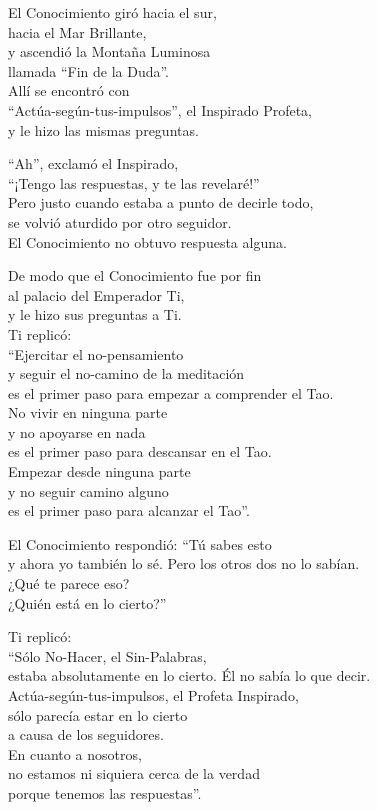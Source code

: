 \documentclass[hidelinks]{memoir}
\begin{document}
	El Conocimiento giró hacia el sur,\\
	hacia el Mar Brillante,\\
	y ascendió la Montaña Luminosa\\
	llamada ``Fin de la Duda''.\\
	Allí se encontró con\\
	``Actúa-según-tus-impulsos'', el Inspirado Profeta,\\
	y le hizo las mismas preguntas.
	
	``Ah'', exclamó el Inspirado,\\
	``¡Tengo las respuestas, y te las revelaré!''\\
	Pero justo cuando estaba a punto de decirle todo,\\
	se volvió aturdido por otro seguidor.\\
	El Conocimiento no obtuvo respuesta alguna.
	
	De modo que el Conocimiento fue por fin\\
	al palacio del Emperador Ti,\\
	y le hizo sus preguntas a Ti.\\
	Ti replicó:\\
	``Ejercitar el no-pensamiento\\
	y seguir el no-camino de la meditación\\
	es el primer paso para empezar a comprender el Tao.\\
	No vivir en ninguna parte\\
	y no apoyarse en nada\\
	es el primer paso para descansar en el Tao.\\
	Empezar desde ninguna parte\\
	y no seguir camino alguno\\
	es el primer paso para alcanzar el Tao''.
	
	El Conocimiento respondió: ``Tú sabes esto\\
	y ahora yo también lo sé. Pero los otros dos no lo sabían.\\
	¿Qué te parece eso?\\
	¿Quién está en lo cierto?''
	
	Ti replicó:\\
	``Sólo No-Hacer, el Sin-Palabras,\\
	estaba absolutamente en lo cierto. Él no sabía lo que decir.\\
	Actúa-según-tus-impulsos, el Profeta Inspirado,\\
	sólo parecía estar en lo cierto\\
	a causa de los seguidores.\\
	En cuanto a nosotros,\\
	no estamos ni siquiera cerca de la verdad\\
	porque tenemos las respuestas''.
	
\end{document}
